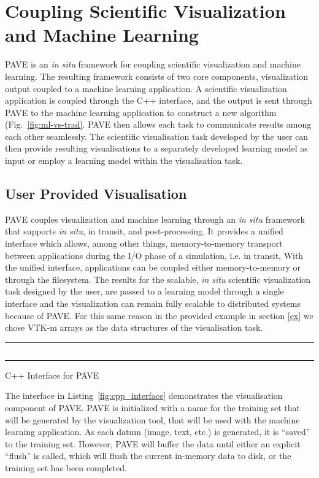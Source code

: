 \section{Coupling Scientific Visualization and Machine Learning}
PAVE is an \textit{in situ} framework for coupling scientific visualization and machine learning. The resulting framework consists of two core components, visualization output coupled to a machine learning application. A scientific visualization application is coupled through the C++ interface, and the output is sent through PAVE to the machine learning application to construct a new algorithm (Fig.~\ref{fig:ml-vs-trad}. PAVE then allows each task to communicate results among each other seamlessly. The scientific visualisation task developed by the user can then provide resulting visualisations to a separately developed learning model as input or employ a learning model within the visualisation task. 
\subsection{User Provided Visualisation}
\label{sec:PAVEvis}
PAVE couples visualization and machine learning through an \textit{in situ} framework that supports \textit{in situ}, in transit, and post-processing. It provides a unified interface which allows, among other things, memory-to-memory transport between applications during the I/O phase of a simulation, i.e. in transit, With the  unified interface, applications can be coupled either memory-to-memory or through the filesystem. The results for the scalable, \textit{in situ} scientific visualization task designed by the user, are passed to a learning model through a single interface and the visualization can remain fully scalable to distributed systems because of PAVE. For this same reason in the provided example in section \ref{ex} we chose VTK-m arrays as the data structures of the visualisation task. 

\begin{listing}[htb]
\noindent\rule{0.5\textwidth}{1pt}
\inputminted{cpp}{pave_pt.py}
\noindent\rule{0.5\textwidth}{1pt}
\caption{C++ Interface for PAVE}
\label{fig:cpp_interface}
\end{listing}

The interface in Listing~\ref{fig:cpp_interface} demonstrates the visualisation component of PAVE. PAVE is initialized with a name for the training set that will be generated by the visualization tool, that will be used with the machine learning application. As each datum (image, text, etc.) is generated, it is ``saved'' to the training set. However, PAVE will buffer the data until either an explicit ``flush'' is called, which will flush the current in-memory data to disk, or the training set has been completed. 

